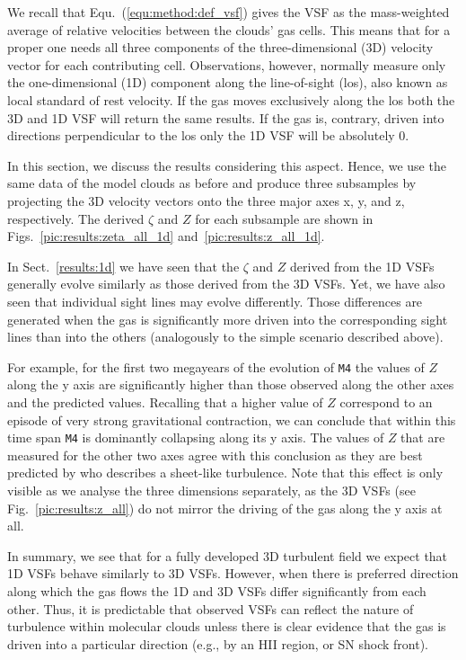 We recall that Equ.~(\ref{equ:method:def_vsf}) gives the VSF  as the mass-weighted average of relative velocities between the clouds' gas cells.
This means that for a proper one needs all three components of the three-dimensional (3D) velocity vector for each contributing cell.
Observations, however, normally measure only the one-dimensional (1D) component along the line-of-sight (los), also known as local standard of rest velocity.
If the gas moves exclusively along the los both the 3D and 1D VSF will return the same results. 
If the gas is, contrary, driven into directions perpendicular to the los only the 1D VSF will be absolutely 0.
 
In this section, we discuss the results considering this aspect.
Hence, we use the same data of the model clouds as before and produce three subsamples by projecting the 3D velocity vectors onto the three  major axes x, y, and z, respectively.
The derived $\zeta$ and $Z$ for each subsample are shown in Figs.~\ref{pic:results:zeta_all_1d} and~\ref{pic:results:z_all_1d}.

In Sect.~\ref{results:1d} we have seen that the $\zeta$ and $Z$ derived from the 1D VSFs generally evolve similarly as those derived from the 3D VSFs.
Yet, we have also seen that individual sight lines may evolve differently.
Those differences are generated when the gas is significantly more driven into the corresponding sight lines than into the others (analogously to the simple scenario described above). 

For example, for the first two megayears of the evolution of \texttt{M4} the values of $Z$ along the y axis are significantly higher than those observed along the other axes and the predicted values.
Recalling that a higher value of $Z$ correspond to an episode of very strong gravitational contraction, we can conclude that within this time span \texttt{M4} is dominantly collapsing along its y axis. 
The values of $Z$ that are measured for the other two axes agree with this conclusion as they are best predicted by \citet{Boldyrev2002} who describes a sheet-like turbulence. 
Note that this effect is only visible as we analyse the three dimensions separately, as the 3D VSFs (see Fig.~\ref{pic:results:z_all}) do not mirror the driving of the gas along the y axis at all.

In summary, we see that for a fully developed 3D turbulent field we expect that 1D VSFs behave similarly to 3D VSFs.
However, when there is preferred direction along which the gas flows the 1D and 3D VSFs differ significantly from each other. 
Thus, it is predictable that observed VSFs can reflect the nature of turbulence within molecular clouds unless there is clear evidence that the gas is driven into a particular direction (e.g., by an HII region, or SN shock front).

